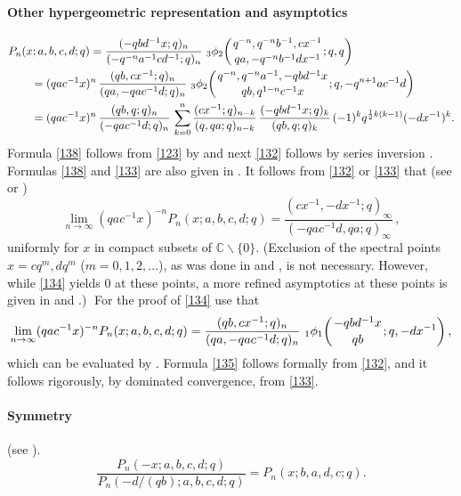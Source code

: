 \documentclass[twoside,11pt]{article}
\newcommand\CC{\mathbb{C}}
\newcommand\half{\frac12}
\newcommand\iy\infty
\newcommand{\qhyp}[5]{\,\mbox{}_{#1}\phi_{#2}\!\left(
  \genfrac{}{}{0pt}{}{#3}{#4};#5\right)}
\begin{document}
\paragraph{Other hypergeometric representation and asymptotics}
\begin{align}
&P_n(x;a,b,c,d;q)
=\frac{(-qbd^{-1}x;q)_n}{(-q^{-n}a^{-1}cd^{-1};q)_n}\,
\qhyp32{q^{-n},q^{-n}b^{-1},cx^{-1}}{qa,-q^{-n}b^{-1}dx^{-1}}{q,q}
\label{138}\\
&\qquad=(qac^{-1}x)^n\,\frac{(qb,cx^{-1};q)_n}{(qa,-qac^{-1}d;q)_n}\,
\qhyp32{q^{-n},q^{-n}a^{-1},-qbd^{-1}x}{qb,q^{1-n}c^{-1}x}
{q,-q^{n+1}ac^{-1}d}
\label{132}\\
&\qquad=(qac^{-1}x)^n\,\frac{(qb,q;q)_n}{(-qac^{-1}d;q)_n}\,
\sum_{k=0}^n\frac{(cx^{-1};q)_{n-k}}{(q,qa;q)_{n-k}}\,
\frac{(-qbd^{-1}x;q)_k}{(qb,q;q)_k}\,(-1)^k q^{\half k(k-1)}(-dx^{-1})^k.
\label{133}
\end{align}
Formula \eqref{138} follows from \eqref{123} by
 and next \eqref{132} follows by series inversion
.
Formulas \eqref{138} and \eqref{133} are also given in
.
It follows from \eqref{132} or \eqref{133} that
(see  or )
\begin{equation}
\lim_{n\to\iy}(qac^{-1}x)^{-n} P_n(x;a,b,c,d;q)
=\frac{(cx^{-1},-dx^{-1};q)_\iy}{(-qac^{-1}d,qa;q)_\iy}\,,
\label{134}
\end{equation}
uniformly for $x$ in compact subsets of $\CC\backslash\{0\}$.
(Exclusion of the spectral points $x=cq^m,dq^m$ ($m=0,1,2,\ldots$),
as was done in  and , is not necessary. However,
while \eqref{134} yields 0 at these points, a more refined asymptotics
at these points is given in  and .)$\;$
For the proof of \eqref{134} use that
\begin{equation}
\lim_{n\to\iy}(qac^{-1}x)^{-n} P_n(x;a,b,c,d;q)
=\frac{(qb,cx^{-1};q)_n}{(qa,-qac^{-1}d;q)_n}\,
\qhyp11{-qbd^{-1}x}{qb}{q,-dx^{-1}},
\label{135}
\end{equation}
which can be evaluated by .
Formula \eqref{135} follows formally from \eqref{132}, and it follows rigorously, by
dominated convergence, from \eqref{133}.
%
\paragraph{Symmetry}
(see \cite[\S2.5]{K17}).
\begin{equation}
\frac{P_n(-x;a,b,c,d;q)}{P_n(-d/(qb);a,b,c,d;q)}
=P_n(x;b,a,d,c;q).
\end{equation}
%
\end{document}
